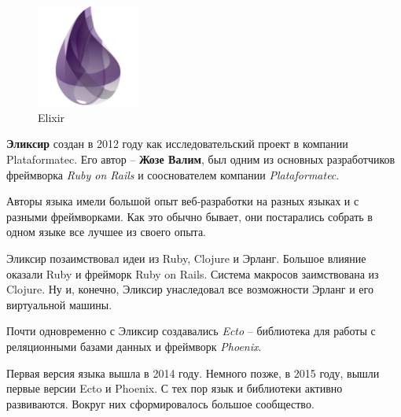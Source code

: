 \begin{figure}[h]
  \centering
  \includegraphics[width=0.3\textwidth]{./lesson_02/img/elixir_logo.png}
  \caption{Elixir}
\end{figure}

\textbf{Эликсир} создан в 2012 году как исследовательский проект в компании Plataformatec. Его автор -- \textbf{Жозе Валим}, был одним из основных разработчиков фреймворка \textit{Ruby on Rails} и сооснователем компании \textit{Plataformatec}.

Авторы языка имели большой опыт веб-разработки на разных языках и с разными фреймворками. Как это обычно бывает, они постарались собрать в одном языке все лучшее из своего опыта.

Эликсир позаимствовал идеи из Ruby, Clojure и Эрланг. Большое влияние оказали Ruby и фрейморк Ruby on Rails. Система макросов заимствована из Clojure. Ну и, конечно, Эликсир унаследовал все возможности Эрланг и его виртуальной машины.

Почти одновременно с Эликсир создавались \textit{Ecto} -- библиотека для работы с реляционными базами данных и фреймворк \textit{Phoenix}.

Первая версия языка вышла в 2014 году. Немного позже, в 2015 году, вышли первые версии Ecto и Phoenix. С тех пор язык и библиотеки активно развиваются. Вокруг них сформировалось большое сообщество.
